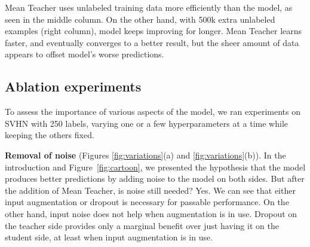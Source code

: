\documentclass{article}
\begin{document}
Mean Teacher uses unlabeled training data more efficiently than the  model, as seen in the middle column.
On the other hand, with 500k extra unlabeled examples (right column),  model keeps improving for longer.
Mean Teacher learns faster, and eventually converges to a better result, but the sheer amount of data appears to offset  model's worse predictions. 

\subsection{Ablation experiments}
\label{subsect:ablation}

To assess the importance of various aspects of the model, we ran experiments on SVHN with 250 labels, varying one or a few hyperparameters at a time while keeping the others fixed.

\textbf{Removal of noise} (Figures \ref{fig:variations}(a) and \ref{fig:variations}(b)).
In the introduction and Figure~\ref{fig:cartoon}, we presented the hypothesis that the  model produces better predictions by adding noise to the model on both sides.
But after the addition of Mean Teacher, is noise still needed?
Yes.
We can see that either input augmentation or dropout is necessary for passable performance.
On the other hand, input noise does not help when augmentation is in use.
Dropout on the teacher side provides only a marginal benefit over just having it on the student side, at least when input augmentation is in use.
\end{document}
